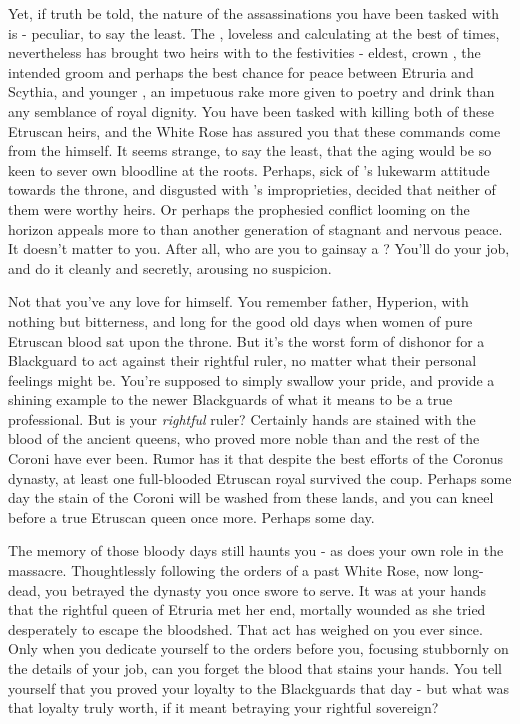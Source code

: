 \documentclass[char]{Kos}
\begin{document}
    Yet, if truth be told, the nature of the assassinations you have been tasked with is - peculiar, to say the least. The \cEtruriaKing{\monarch}, loveless and calculating at the best of times, nevertheless has brought \cEtruriaKing{\their} two heirs with \cEtruriaKing{\them} to the festivities - \cEtruriaKing{\their} eldest, crown \cGroom{\Prince} \cGroom{}, the intended groom and perhaps the best chance for peace between Etruria and Scythia, and \cEtruriaKing{\their} younger \cPoet{\offspring} \cPoet{}, an impetuous rake more given to poetry and drink than any semblance of royal dignity. You have been tasked with killing both of these Etruscan heirs, and the White Rose has assured you that these commands come from the \cEtruriaKing{\monarch} himself. It seems strange, to say the least, that the aging \cEtruriaKing{} would be so keen to sever \cEtruriaKing{\their} own bloodline at the roots. Perhaps, sick of \cGroom{}'s lukewarm attitude towards the throne, and disgusted with \cPoet{}'s improprieties, \cEtruriaKing{\they} decided that neither of them were worthy heirs. Or perhaps the prophesied conflict looming on the horizon appeals more to \cEtruriaKing{} than another generation of stagnant and nervous peace. It doesn't matter to you. After all, who are you to gainsay a \cEtruriaKing{\monarch}? You'll do your job, and do it cleanly and secretly, arousing no suspicion. 

    Not that you've any love for \cEtruriaKing{} himself. You remember \cEtruriaKing{\their} father, Hyperion, with nothing but bitterness, and long for the good old days when women of pure Etruscan blood sat upon the throne. But it's the worst form of dishonor for a Blackguard to act against their rightful ruler, no matter what their personal feelings might be. You're supposed to simply swallow your pride, and provide a shining example to the newer Blackguards of what it means to be a true professional. But is \cEtruriaKing{\Monarch} \cEtruriaKing{} your \emph{rightful} ruler? Certainly \cEtruriaKing{\their} hands are stained with the blood of the ancient queens, who proved more noble than \cEtruriaKing{\they} and the rest of the Coroni have ever been. Rumor has it that despite the best efforts of the Coronus dynasty, at least one full-blooded Etruscan royal survived the coup. Perhaps some day the stain of the Coroni will be washed from these lands, and you can kneel before a true Etruscan queen once more. Perhaps some day.

The memory of those bloody days still haunts you - as does your own role in the massacre. Thoughtlessly following the orders of a past White Rose, now long-dead, you betrayed the dynasty you once swore to serve. It was at your hands that the rightful queen of Etruria met her end, mortally wounded as she tried desperately to escape the bloodshed. That act has weighed on you ever since. Only when you dedicate yourself to the orders before you, focusing stubbornly on the details of your job, can you forget the blood that stains your hands. You tell yourself that you proved your loyalty to the Blackguards that day - but what was that loyalty truly worth, if it meant betraying your rightful sovereign?
\end{document}
